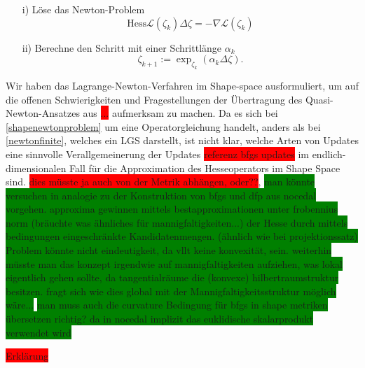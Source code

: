 \documentclass[bibliography=totoc,12pt,a4paper]{scrartcl}
\theoremstyle{exampstyle}
\numberwithin{equation}{section}
\begin{document}
\begin{itemize}
	\item[i)] Löse das Newton-Problem \\
	\begin{equation}\label{shapenewtonproblem}
	\text{Hess}\mathcal{L}(\zeta_k)\Delta \zeta = - \nabla \mathcal{L}(\zeta_k)
	\end{equation}
	\item[ii)] Berechne den Schritt mit einer Schrittlänge $\alpha_k$
	\begin{equation}
	\zeta_{k+1} := \exp_{\zeta_k}(\alpha_k \Delta \zeta).
	\end{equation}
\end{itemize}
Wir haben das Lagrange-Newton-Verfahren im Shape-space ausformuliert, um auf die offenen Schwierigkeiten und Fragestellungen der Übertragung des Quasi-Newton-Ansatzes aus \colorbox{red}{...} aufmerksam zu machen. Da es sich bei 
\ref{shapenewtonproblem} um eine Operatorgleichung handelt, anders als bei \ref{newtonfinite}, welches ein LGS darstellt, ist nicht klar, welche Arten von Updates eine sinnvolle Verallgemeinerung der Updates \colorbox{red}{referenz bfgs updates} im endlich-dimensionalen Fall für die Approximation des Hesseoperators im Shape Space sind. \colorbox{red}{dies müsste ja auch von der Metrik abhängen, oder??},
\colorbox{green}{man könnte versuchen in analogie zu der Konstruktion von bfgs und dfp aus nocedal vorgehen. approxima gewinnen mittels bestapproximationen unter frobennius norm (bräuchte was ähnliches für mannigfaltigkeiten...) der Hesse durch mittels bedingungen eingeschränkte Kandidatenmengen. (ähnlich wie bei projektionssatz) Problem könnte nicht eindeutigkeit, da vllt keine konvexität, sein. weiterhin müsste man das konzept irgendwie auf mannigfaltigkeiten aufziehen, was lokal eigentlich gehen sollte, da tangentialräume die (konvexe) hilbertraumstruktur besitzen. fragt sich wie dies global mit der Mannigfaltigkeitsstruktur möglich wäre...}
\colorbox{green}{man muss auch die curvature Bedingung für bfgs in shape metriken übersetzen richtig? da in nocedal implizit das euklidische skalarprodukt verwendet wird}




\colorbox{red}{Erklärung}


\newpage
\nocite{*}


\end{document}
